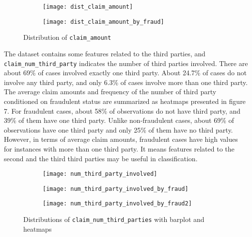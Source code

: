 \documentclass[12pt]{article}
\begin{document}
\begin{figure}[h]
\centering
\begin{subfigure}{.5\textwidth}
  \centering
  \texttt{[image: dist\_claim\_amount]}
  \label{fig:sub1}
\end{subfigure}%
\begin{subfigure}{.5\textwidth}
  \centering
  \texttt{[image: dist\_claim\_amount\_by\_fraud]}
  \label{fig:sub2}
\end{subfigure}
\caption{Distribution of \texttt{claim\_amount}}
\label{fig:test}
\end{figure}

The dataset contains some features related to the third parties, and \texttt{claim\_num\_third\_party} indicates the number of third parties involved. There are about 69\% of cases involved exactly one third party. About 24.7\% of cases do not involve any third party, and only 6.3\% of cases involve more than one third party. The average claim amounts and frequency of the number of third party conditioned on fraudulent status are summarized as heatmaps presented in figure 7. For fraudulent cases, about 58\% of observations do not have third party, and 39\% of them have one third party. Unlike non-fraudulent cases, about 69\% of observations have one third party and only 25\% of them have no third party. However, in terms of average claim amounts, fraudulent cases have high values for instances with more than one third party. It means features related to the second and the third third parties may be useful in classification.

\begin{figure}[h]
\centering
\begin{subfigure}{.6\textwidth}
  \centering
  \texttt{[image: num\_third\_party\_involved]}
  \label{fig:sub1}
\end{subfigure}%
\begin{subfigure}{.4\textwidth}
  \centering
  \texttt{[image: num\_third\_party\_involved\_by\_fraud]}
  \label{fig:sub2}
\end{subfigure}
\begin{subfigure}{0.7\textwidth}
  \centering
  \texttt{[image: num\_third\_party\_involved\_by\_fraud2]}
  \label{fig:sub2} 
\end{subfigure}
\caption{Distributions of \texttt{claim\_num\_third\_parties} with barplot and heatmaps}
\label{fig:eda_third_party_num}
\end{figure}
\end{document}
